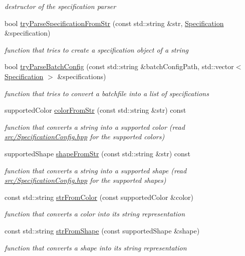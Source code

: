 \begin{DoxyCompactItemize}
\begin{DoxyCompactList}\small\item\em destructor of the specification parser \end{DoxyCompactList}\item 
bool \hyperlink{classParser_a8af5f2b3cbe50b7b4ad41e0a54dd70f5}{try\+Parse\+Specification\+From\+Str} (const std\+::string \&str, \hyperlink{structSpecification}{Specification} \&specification)
\begin{DoxyCompactList}\small\item\em function that tries to create a specification object of a string \end{DoxyCompactList}\item 
bool \hyperlink{classParser_a5c5356810a3861d9fe50353fbd00040e}{try\+Parse\+Batch\+Config} (const std\+::string \&batch\+Config\+Path, std\+::vector$<$ \hyperlink{structSpecification}{Specification} $>$ \&specifications)
\begin{DoxyCompactList}\small\item\em function that tries to convert a batchfile into a list of specifications \end{DoxyCompactList}\item 
supported\+Color \hyperlink{classParser_abfb3329a63d465462db4778609abd18a}{color\+From\+Str} (const std\+::string \&str) const 
\begin{DoxyCompactList}\small\item\em function that converts a string into a supported color (read \hyperlink{SpecificationConfig_8hpp_source}{src/\+Specification\+Config.\+hpp} for the supported colors) \end{DoxyCompactList}\item 
supported\+Shape \hyperlink{classParser_a2530730579b210a6d64154404b670eea}{shape\+From\+Str} (const std\+::string \&str) const 
\begin{DoxyCompactList}\small\item\em function that converts a string into a supported shape (read \hyperlink{SpecificationConfig_8hpp_source}{src/\+Specification\+Config.\+hpp} for the supported shapes) \end{DoxyCompactList}\item 
const std\+::string \hyperlink{classParser_a8453d650d2ac054b3ca603eca69802db}{str\+From\+Color} (const supported\+Color \&color)
\begin{DoxyCompactList}\small\item\em function that converts a color into its string representation \end{DoxyCompactList}\item 
const std\+::string \hyperlink{classParser_a5938f4f0fb88e6a5a4fdc1e795920bb3}{str\+From\+Shape} (const supported\+Shape \&shape)
\begin{DoxyCompactList}\small\item\em function that converts a shape into its string representation \end{DoxyCompactList}\end{DoxyCompactItemize}


